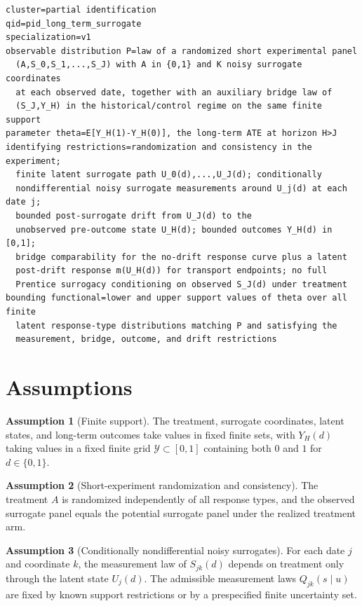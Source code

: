 \documentclass[11pt]{article}
\theoremstyle{definition}
\newtheorem{assumption}{Assumption}
\theoremstyle{plain}
\theoremstyle{remark}
\begin{document}
\begin{verbatim}
cluster=partial identification
qid=pid_long_term_surrogate
specialization=v1
observable distribution P=law of a randomized short experimental panel
  (A,S_0,S_1,...,S_J) with A in {0,1} and K noisy surrogate coordinates
  at each observed date, together with an auxiliary bridge law of
  (S_J,Y_H) in the historical/control regime on the same finite support
parameter theta=E[Y_H(1)-Y_H(0)], the long-term ATE at horizon H>J
identifying restrictions=randomization and consistency in the experiment;
  finite latent surrogate path U_0(d),...,U_J(d); conditionally
  nondifferential noisy surrogate measurements around U_j(d) at each date j;
  bounded post-surrogate drift from U_J(d) to the
  unobserved pre-outcome state U_H(d); bounded outcomes Y_H(d) in [0,1];
  bridge comparability for the no-drift response curve plus a latent
  post-drift response m(U_H(d)) for transport endpoints; no full
  Prentice surrogacy conditioning on observed S_J(d) under treatment
bounding functional=lower and upper support values of theta over all finite
  latent response-type distributions matching P and satisfying the
  measurement, bridge, outcome, and drift restrictions
\end{verbatim}

\section{Assumptions}
\begin{assumption}[Finite support]\label{ass:finite}
The treatment, surrogate coordinates, latent states, and long-term outcomes take values in fixed finite sets, with \(Y_H(d)\) taking values in a fixed finite grid \(\mathcal{Y}\subset[0,1]\) containing both \(0\) and \(1\) for \(d\in\{0,1\}\).
\end{assumption}

\begin{assumption}[Short-experiment randomization and consistency]\label{ass:randomization}
The treatment \(A\) is randomized independently of all response types, and the observed surrogate panel equals the potential surrogate panel under the realized treatment arm.
\end{assumption}

\begin{assumption}[Conditionally nondifferential noisy surrogates]\label{ass:noisy-measurement}
For each date \(j\) and coordinate \(k\), the measurement law of \(S_{jk}(d)\) depends on treatment only through the latent state \(U_j(d)\).  The admissible measurement laws \(Q_{jk}(s\mid u)\) are fixed by known support restrictions or by a prespecified finite uncertainty set.
\end{assumption}
\end{document}
